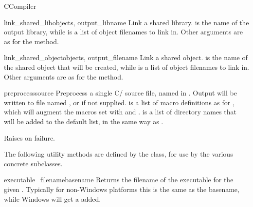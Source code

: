\documentclass{manual}
\begin{document}
\begin{classdesc}{CCompiler}{}
\begin{methoddesc}{link_shared_lib}{objects, output_libname}
Link a shared library.  is the name of the output 
library, while  is a list of object filenames to link in. 
Other arguments are as for the  method. 
\end{methoddesc}

\begin{methoddesc}{link_shared_object}{objects, output_filename}
Link a shared object.  is the name of the shared object
that will be created, while  is a list of object filenames 
to link in. Other arguments are as for the  method. 
\end{methoddesc}

\begin{methoddesc}{preprocess}{source}
Preprocess a single C/\Cpp{} source file, named in .
Output will be written to file named , or  if
 not supplied.   is a list of macro
definitions as for , which will augment the macros set
with  and .  
 is a list of directory names that will be added to the 
default list, in the same way as .

Raises  on failure.
\end{methoddesc}

The following utility methods are defined by the  class,
for use by the various concrete subclasses.

\begin{methoddesc}{executable_filename}{basename}
Returns the filename of the executable for the given . 
Typically for non-Windows platforms this is the same as the basename, 
while Windows will get a  added.
\end{methoddesc}


\end{classdesc}
\end{document}
